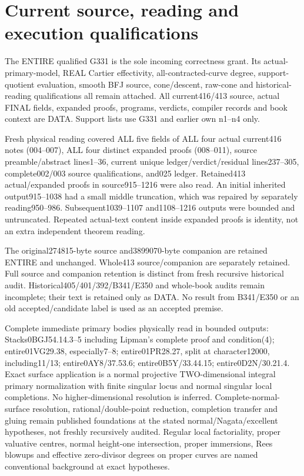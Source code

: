 \documentclass[11pt]{article}
\begin{document}
\section*{Current source, reading and execution qualifications}
The ENTIRE qualified G331 is the sole incoming correctness grant. Its actual-primary-model, REAL Cartier effectivity, all-contracted-curve degree, support-quotient evaluation, smooth BFJ source, cone/descent, raw-cone and historical-reading qualifications all remain attached. All current416/413 source, actual FINAL fields, expanded proofs, programs, verdicts, compiler records and book context are DATA. Support lists use G331 and earlier own n1--n4 only.

Fresh physical reading covered ALL five fields of ALL four actual current416 notes (004--007), ALL four distinct expanded proofs (008--011), source preamble/abstract lines1--36, current unique ledger/verdict/residual lines237--305, complete002/003 source qualifications, and025 ledger. Retained413 actual/expanded proofs in source915--1216 were also read. An initial inherited output915--1038 had a small middle truncation, which was repaired by separately reading950--986. Subsequent1039--1107 and1108--1216 outputs were bounded and untruncated. Repeated actual-text content inside expanded proofs is identity, not an extra independent theorem reading.

The original274815-byte source and3899070-byte companion are retained ENTIRE and unchanged. Whole413 source/companion are separately retained. Full source and companion retention is distinct from fresh recursive historical audit. Historical405/401/392/B341/E350 and whole-book audits remain incomplete; their text is retained only as DATA. No result from B341/E350 or an old accepted/candidate label is used as an accepted premise.

Complete immediate primary bodies physically read in bounded outputs: Stacks0BGJ54.14.3--5 including Lipman's complete proof and condition(4); entire01VG29.38, especially7--8; entire01PR28.27, split at character12000, including11/13; entire0AY8/37.53.6; entire0B5Y/33.44.15; entire0D2N/30.21.4. Exact surface application is a normal projective TWO-dimensional integral primary normalization with finite singular locus and normal singular local completions. No higher-dimensional resolution is inferred. Complete-normal-surface resolution, rational/double-point reduction, completion transfer and gluing remain published foundations at the stated normal/Nagata/excellent hypotheses, not freshly recursively audited. Regular local factoriality, proper valuative centres, normal height-one intersection, proper immersions, Rees blowups and effective zero-divisor degrees on proper curves are named conventional background at exact hypotheses.
\end{document}
